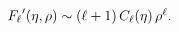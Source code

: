 $\mathop{F_{\ell}\/}\nolimits'\!\left(\eta,\rho\right)\sim(\ell+1)\mathop{C_{%
\ell}\/}\nolimits\!\left(\eta\right)\rho^{\ell}.$